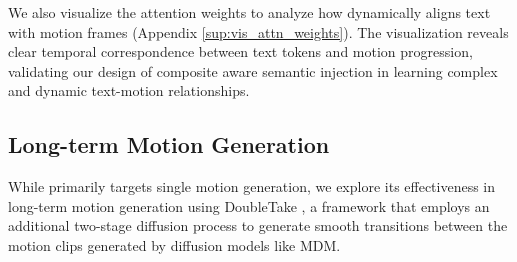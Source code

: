 We also visualize the attention weights to analyze how {\modulename} dynamically aligns text with motion frames (Appendix \ref{sup:vis_attn_weights}). 
The visualization reveals clear temporal correspondence between text tokens and motion progression, validating our design of composite aware semantic injection in learning complex and dynamic text-motion relationships.


\vspace{-3pt}
\subsection{Long-term Motion Generation}
\label{sub:long-term}
\vspace{-1pt}


While {\modulename} primarily targets single motion generation, we explore its effectiveness in long-term motion generation using DoubleTake \cite{shafir2024human}, a framework that employs an additional two-stage diffusion process to generate smooth transitions between the motion clips generated by diffusion models like MDM.

